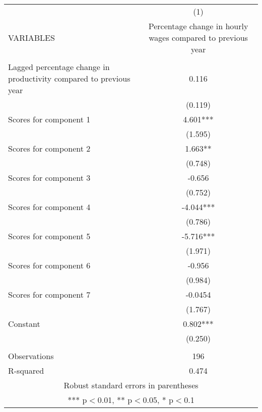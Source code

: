 \documentclass[]{article}
\begin{document}
\begin{tabular}{lc} \hline
 & (1) \\
VARIABLES & Percentage change in hourly wages compared to previous year \\ \hline
 &  \\
Lagged percentage change in productivity compared to previous year & 0.116 \\
 & (0.119) \\
Scores for component 1 & 4.601*** \\
 & (1.595) \\
Scores for component 2 & 1.663** \\
 & (0.748) \\
Scores for component 3 & -0.656 \\
 & (0.752) \\
Scores for component 4 & -4.044*** \\
 & (0.786) \\
Scores for component 5 & -5.716*** \\
 & (1.971) \\
Scores for component 6 & -0.956 \\
 & (0.984) \\
Scores for component 7 & -0.0454 \\
 & (1.767) \\
Constant & 0.802*** \\
 & (0.250) \\
 &  \\
Observations & 196 \\
 R-squared & 0.474 \\ \hline
\multicolumn{2}{c}{ Robust standard errors in parentheses} \\
\multicolumn{2}{c}{ *** p$<$0.01, ** p$<$0.05, * p$<$0.1} \\
\end{tabular}
\end{document}
